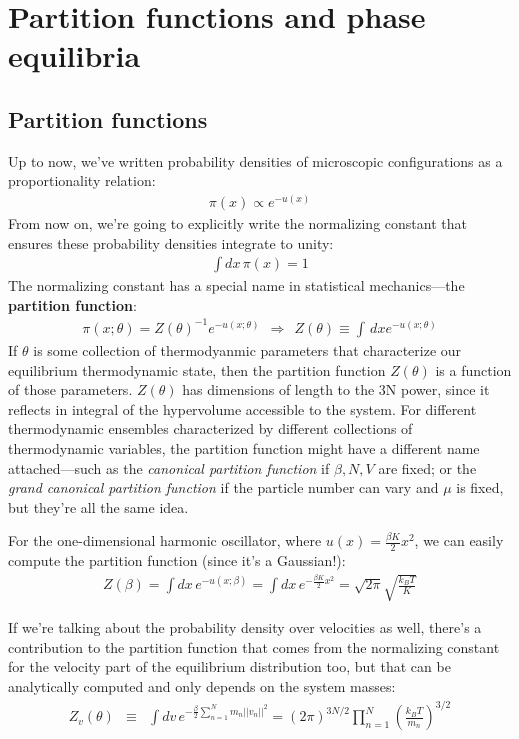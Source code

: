 \documentclass[english,course]{lecture}
\begin{document}
\section{Partition functions and phase equilibria}

\subsection{Partition functions}

Up to now, we've written probability densities of microscopic configurations as a proportionality relation:
\begin{eqnarray}
\pi(x) \propto e^{-u(x)}
\end{eqnarray}
From now on, we're going to explicitly write the normalizing constant that ensures these probability densities integrate to unity:
\begin{eqnarray}
\int dx \, \pi(x) = 1
\end{eqnarray}
The normalizing constant has a special name in statistical mechanics---the {\bf partition function}:
\begin{eqnarray}
\pi(x; \theta) = Z(\theta)^{-1} e^{-u(x; \theta)} \:\: \Rightarrow \:\: Z(\theta) \equiv \int \, dx e^{-u(x; \theta)}
\end{eqnarray}
If $\theta$ is some collection of thermodyanmic parameters that characterize our equilibrium thermodynamic state, then the partition function $Z(\theta)$ is a function of those parameters.
$Z(\theta)$ has dimensions of length to the 3N power, since it reflects in integral of the hypervolume accessible to the system.
For different thermodynamic ensembles characterized by different collections of thermodynamic variables, the partition function might have a different name attached---such as the \emph{canonical partition function} if $\beta, N, V$ are fixed; or the \emph{grand canonical partition function} if the particle number can vary and $\mu$ is fixed, but they're all the same idea.

For the one-dimensional harmonic oscillator, where $u(x) = \frac{\beta K}{2} x^2$, we can easily compute the partition function (since it's a Gaussian!):
\begin{eqnarray}
Z(\beta) = \int dx \, e^{-u(x; \beta)} = \int dx \, e^{-\frac{\beta K}{2} x^2} = \sqrt{2 \pi} \sqrt{\frac{k_B T}{K}}
\end{eqnarray}

If we're talking about the probability density over velocities as well, there's a contribution to the partition function that comes from the normalizing constant for the velocity part of the equilibrium distribution too, but that can be analytically computed and only depends on the system masses:
\begin{eqnarray}
Z_v(\theta) &\equiv& \int dv \, e^{-\frac{\beta}{2} \sum_{n=1}^N m_n ||v_n||^2} = (2 \pi)^{3N/2} \prod_{n=1}^N \left(\frac{k_B T}{m_n}\right)^{3/2}
\end{eqnarray}
\end{document}
